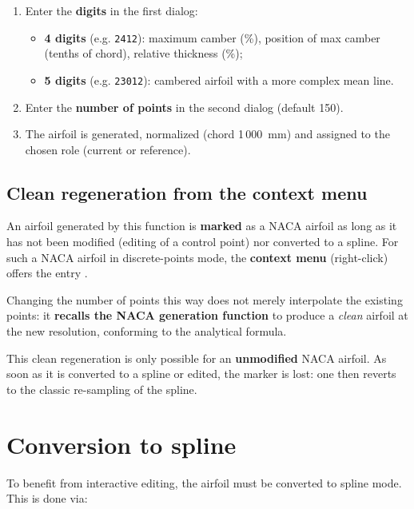 \begin{enumerate}
    \item Enter the \textbf{digits} in the first dialog:
        \begin{itemize}
            \item \textbf{4 digits} (e.g. \texttt{2412}): maximum
                camber (\%), position of max camber (tenths of
                chord), relative thickness (\%);
            \item \textbf{5 digits} (e.g. \texttt{23012}): cambered
                airfoil with a more complex mean line.
        \end{itemize}
    \item Enter the \textbf{number of points} in the second dialog
        (default 150).
    \item The airfoil is generated, normalized (chord 1\,000~mm) and
        assigned to the chosen role (current or reference).
\end{enumerate}

\subsection{Clean regeneration from the context menu}

An airfoil generated by this function is \textbf{marked} as a NACA
airfoil as long as it has not been modified (editing of a control
point) nor converted to a spline. For such a NACA airfoil in
discrete-points mode, the \textbf{context menu} (right-click) offers
the entry .

Changing the number of points this way does not merely interpolate
the existing points: it \textbf{recalls the NACA generation
function} to produce a \emph{clean} airfoil at the new resolution,
conforming to the analytical formula.

\begin{noteinfo}
This clean regeneration is only possible for an \textbf{unmodified}
NACA airfoil. As soon as it is converted to a spline or edited,
the marker is lost: one then reverts to the classic
re-sampling of the spline.
\end{noteinfo}

\section{Conversion to spline}
\label{sec:convertspline}

To benefit from interactive editing, the airfoil must be converted
to spline mode. This is done via:

